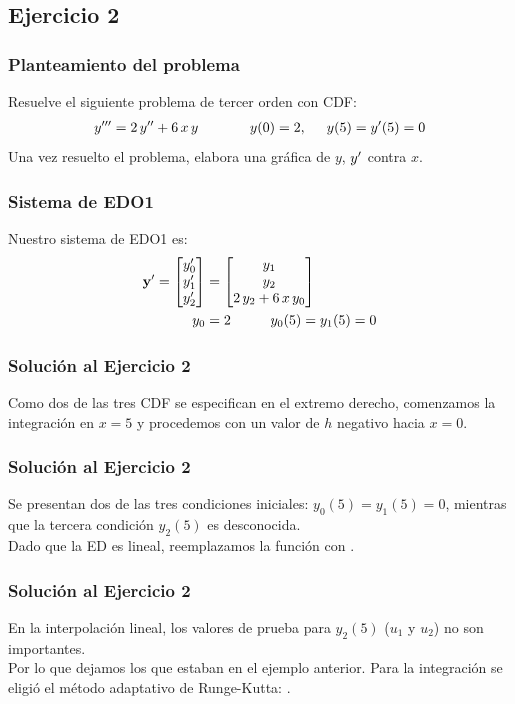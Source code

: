 \documentclass[12pt]{beamer}
\begin{document}
\subsection{Ejercicio 2}

\begin{frame}
\frametitle{Planteamiento del problema}
Resuelve el siguiente problema de tercer orden con CDF:
\pause
\begin{align*}
{y}^{\prime \prime \prime} = 2 \, {y}^{\prime \prime} + 6 \, x \, y \hspace{1.3cm} y (0) = 2, \hspace{0.5cm} y (5) = {y}^{\prime} (5) = 0
\end{align*}
Una vez resuelto el problema, elabora una gráfica de $y$, ${y}^{\prime}$ contra $x$.
\end{frame}
\begin{frame}
\frametitle{Sistema de EDO1}
Nuestro sistema de EDO1 es:
\pause
\begin{align*}
{\mathbf{y}}^{\prime} = \begin{bmatrix}
{y}^{\prime}_{0} \\
{y}^{\prime}_{1} \\
{y}^{\prime}_{2}
\end{bmatrix}
&=
\begin{bmatrix}
y_{1} \\
y_{2} \\
2 \, y_{2} + 6 \, x \, y_{0}
\end{bmatrix}
\\
y_{0} &= 2 \hspace{1cm} y_{0} (5) = y_{1} (5) = 0
\end{align*}
\end{frame}
\begin{frame}
\frametitle{Solución al Ejercicio 2}
Como dos de las tres CDF se especifican en el extremo derecho, comenzamos la integración en $x = 5$ y procedemos con un valor de $h$ negativo hacia $x = 0$.
\end{frame}
\begin{frame}
\frametitle{Solución al Ejercicio 2}
Se presentan dos de las tres condiciones iniciales: $y_{0} (5) = y_{1} (5) = 0$, \pause mientras que la tercera condición $y_{2} (5)$ es desconocida.
\\
\bigskip
\pause
Dado que la ED es lineal, reemplazamos la función  con .
\end{frame}
\begin{frame}
\frametitle{Solución al Ejercicio 2}
En la interpolación lineal, los valores de prueba para $y_{2} (5)$ ($u_{1}$ y $u_{2}$) no son importantes.
\\
\bigskip
Por lo que dejamos los que estaban en el ejemplo anterior. \pause Para la integración se eligió el método adaptativo de Runge-Kutta: .
\end{frame}
\end{document}
